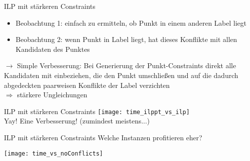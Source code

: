 \documentclass[ngerman,aspectratio=169,10pt]{beamer}
\begin{document}
\begin{frame}{ILP mit stärkeren Constraints}
    \begin{itemize}
        \item Beobachtung 1: einfach zu ermitteln, ob Punkt in einem anderen Label liegt
        \item Beobachtung 2: wenn Punkt in Label liegt, hat dieses Konflikte mit allen Kandidaten des Punktes
    \end{itemize}
    \pause
    $\longrightarrow$ Simple Verbesserung: Bei Generierung der Punkt-Constraints direkt alle Kandidaten mit einbeziehen, die den Punkt umschließen und auf die dadurch abgedeckten paarweisen Konflikte der Label verzichten\\
    $\Longrightarrow$ stärkere Ungleichungen
\end{frame}

\begin{frame}{ILP mit stärkeren Constraints}
    \centering
    \texttt{[image: time\_ilppt\_vs\_ilp]}\\
    Yay! Eine Verbesserung! (zumindest meistens...)
\end{frame}

\begin{frame}{ILP mit stärkeren Constraints}
    Welche Instanzen profitieren eher?
    
    \centering
    \texttt{[image: time\_vs\_noConflicts]}
    
\end{frame}
\end{document}
